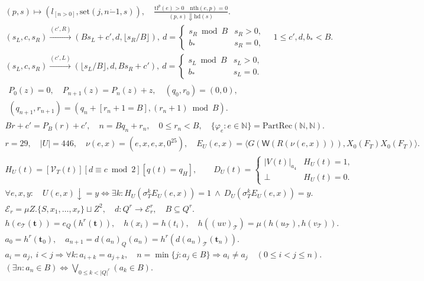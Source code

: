 \documentclass[10pt,letterpaper]{article}
\newcommand{\T}{\mathcal T}
\newcommand{\N}{\mathbb N}
\newcommand{\pair}[2]{\langle #1,#2\rangle}
\newcommand{\wt}{\mathsf W}
\newcommand{\botv}{\perp}
\begin{document}
\begin{gather}
 {(p,s)\mapsto(l_{[n>0]},\mathrm{set}(j,n\mathbin{\dot-}1,s))},
\quad
\frac{\mathrm{tl}^{p}(e)>0\quad\mathrm{nth}(e,p)=0}{(p,s)\Downarrow\mathrm{hd}(s)} .\\
(s_L,c,s_R)\xrightarrow{(c',R)}(B s_L+c',d,\lfloor s_R/B\rfloor),\
 d=\begin{cases}s_R\bmod B&s_R>0,\\ b_\ast&s_R=0,\end{cases}
 \quad 1\le c',d,b_\ast<B.\\
(s_L,c,s_R)\xrightarrow{(c',L)}(\lfloor s_L/B\rfloor,d,Bs_R+c'),\
 d=\begin{cases}s_L\bmod B&s_L>0,\\ b_\ast&s_L=0.\end{cases}\\
\begin{gathered}
P_0(z)=0,\quad P_{n+1}(z)=P_n(z)+z,\quad
(q_0,r_0)=(0,0),\\
(q_{n+1},r_{n+1})=(q_n+[r_n+1=B],(r_n+1)\bmod B).
\end{gathered}\\
 Br+c'=P_B(r)+c',\quad n=Bq_n+r_n,\quad 0\le r_n<B,\quad
 \{\varphi_e:e\in\N\}=\mathrm{PartRec}(\N,\N).\\
r=29,\quad |U|=446,\quad \nu(e,x)=(e,x,e,x,0^{25}),\quad
 E_U(e,x)=\pair{G(\wt(R(\nu(e,x))))}{X_0(F_T)X_0(F_T)}.\\
H_U(t)=[\mathcal V_T(t)] [d\equiv c\bmod2][q(t)=q_H],\qquad
D_U(t)=\begin{cases}|V(t)|_{a_4}&H_U(t)=1,\\\botv&H_U(t)=0.\end{cases}\\
\forall e,x,y:\quad U(e,x)\downarrow=y\iff
 \exists k:H_U(\sigma_T^k E_U(e,x))=1\ \land\ D_U(\sigma_T^k E_U(e,x))=y . \label{sym:60}
\end{gather}
\begin{gather}
\mathcal E_r=\mu Z.\{S,x_1,\ldots,x_r\}\sqcup Z^2,\quad
d:Q^r\to\mathcal E_r^r,\quad B\subseteq Q^r.\\
h(e_\T(\mathbf t))=e_Q(h^r(\mathbf t)),\quad
 h(x_i)=h(t_i),\quad
h((uv)_\T)=\mu(h(u_\T),h(v_\T)).\\
a_0=h^r(\mathbf t_0),\quad
a_{n+1}=d(a_n)_Q(a_n)=h^r(d(a_n)_\T(\mathbf t_n)).\\
a_i=a_j,\ i<j\Rightarrow\forall k:a_{i+k}=a_{j+k},\quad
 n=\min\{j:a_j\in B\}\Rightarrow a_i\ne a_j\quad(0\le i<j\le n).\\
(\exists n:a_n\in B)\Longleftrightarrow\bigvee_{0\le k<|Q|^r}(a_k\in B). \label{sym:65}
\end{gather}
\end{document}
